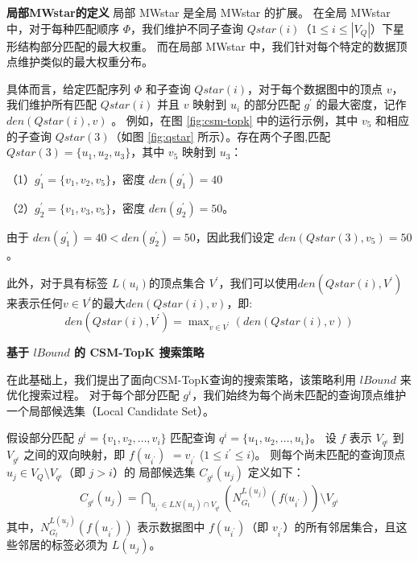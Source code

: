\textbf{局部MWstar的定义}
局部 MWstar 是全局 MWstar 的扩展。
在全局 MWstar 中，对于每种匹配顺序 $\Phi$，我们维护不同子查询 $Qstar(i)$（$1\leq i\leq |V_Q|$）下星形结构部分匹配的最大权重。
而在局部 MWstar 中，我们针对每个特定的数据顶点维护类似的最大权重分布。

具体而言，给定匹配序列 $\Phi$ 和子查询 $Qstar(i)$，对于每个数据图中的顶点 $v$，我们维护所有匹配 $Qstar(i)$ 并且 $v$ 映射到 $u_i$ 的部分匹配 $g^\prime$ 的最大密度，记作 $den(Qstar(i), v)$ 。
例如，在图 \ref{fig:csm-topk} 中的运行示例，其中 $v_5$ 和相应的子查询 $Qstar(3)$（如图 \ref{fig:qstar} 所示）。存在两个子图,匹配 $Qstar(3)=\{u_1, u_2, u_3\}$，其中 $v_5$ 映射到 $u_3$：

     （1）$g_1^\prime=\{v_1, v_2, v_5\}$，密度 $den(g_1^\prime) = 40$

     （2）$g_2^\prime=\{v_1, v_3, v_5\}$，密度 $den(g_2^\prime) = 50$。

由于 $den(g_1^\prime)= 40 < den(g_2^\prime)=50$，因此我们设定 $den(Qstar(3), v_5) = 50$。

此外，对于具有标签 $L(u_i)$的顶点集合 $V^\prime$，我们可以使用$den(Qstar(i), V^\prime)$来表示任何$v\in V^\prime$的最大$den(Qstar(i), v)$，即:
\begin{equation}\label{equation:den-qstar-v}
	den(Qstar(i), V^\prime) = \max\nolimits_{v\in V^\prime}\left(den(Qstar(i), v)\right)
\end{equation}


\textbf{基于 $lBound$ 的 CSM-TopK 搜索策略}

在此基础上，我们提出了面向CSM-TopK查询的搜索策略，该策略利用 $lBound$ 来优化搜索过程。
对于每个部分匹配 $g^i$，我们始终为每个尚未匹配的查询顶点维护一个局部候选集（Local Candidate Set）。


\begin{definition} [局部候选集] \label{def:local-candidate-set}
    假设部分匹配 $g^i=\{v_1, v_2, \dots, v_i\}$ 匹配查询 $q^i=\{u_1, u_2, \dots, u_i\}$。
    设 $f$ 表示  $V_{q^i}$  到 $V_{g^i}$ 之间的双向映射，即 $f(u_{i^\prime})$ $=v_{i^\prime}$ ($1\leq i^\prime\leq i$)。
    则每个尚未匹配的查询顶点 $u_j \in V_Q\setminus V_{q^i}$（即 $j>i$）的 局部候选集 $C_{g^i}(u_j)$ 定义如下：
    \begin{equation} \label{equation:local-candidate-set}
    \begin{multlined}
    C_{g^i}(u_j) = \bigcap\nolimits_{u_{i^\prime}\in LN(u_j)\cap V_{q^i}} \left(N_{G_t}^{L(u_j)}\left(f(u_{i^\prime}\right)\right) \setminus V_{g^i}
    \end{multlined}
    \end{equation}
    其中，$N_{G_t}^{L(u_j)}(f(u_{i^\prime}))$ 表示数据图中 $f(u_{i^\prime})$（即 $v_{i^\prime}$）的所有邻居集合，且这些邻居的标签必须为 $L(u_j)$。
\end{definition}


